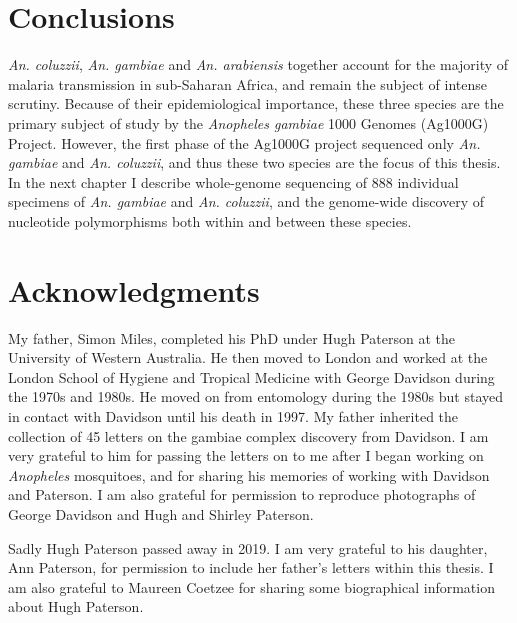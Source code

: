\begin{refsection}
\section{Conclusions}\label{sec:conclusions}


%
\textit{An. coluzzii}, \textit{An. gambiae} and \textit{An. arabiensis} together account for the majority of malaria transmission in sub-Saharan Africa, and remain the subject of intense scrutiny.
%
Because of their epidemiological importance, these three species are the primary subject of study by the \textit{Anopheles gambiae} 1000 Genomes (Ag1000G) Project.
%
However, the first phase of the Ag1000G project sequenced only \textit{An. gambiae} and \textit{An. coluzzii}, and thus these two species are the focus of this thesis.
%
In the next chapter I describe whole-genome sequencing of 888 individual specimens of \textit{An. gambiae} and \textit{An. coluzzii}, and the genome-wide discovery of nucleotide polymorphisms both within and between these species. 


\section{Acknowledgments}\label{sec:acknowledgments}


My father, Simon Miles, completed his PhD under Hugh Paterson at the University of Western Australia. 
%
He then moved to London and worked at the London School of Hygiene and Tropical Medicine with George Davidson during the 1970s and 1980s. 
%
He moved on from entomology during the 1980s but stayed in contact with Davidson until his death in 1997.
%
My father inherited the collection of 45 letters on the gambiae complex discovery from Davidson. 
%
I am very grateful to him for passing the letters on to me after I began working on \textit{Anopheles} mosquitoes, and for sharing his memories of working with Davidson and Paterson.
%
I am also grateful for permission to reproduce photographs of George Davidson and Hugh and Shirley Paterson.


Sadly Hugh Paterson passed away in 2019.
%
I am very grateful to his daughter, Ann Paterson, for permission to include her father's letters within this thesis.
%
I am also grateful to Maureen Coetzee for sharing some biographical information about Hugh Paterson.
%


\printbibliography[
heading=subbibintoc,
title={References}
]


\end{refsection}
